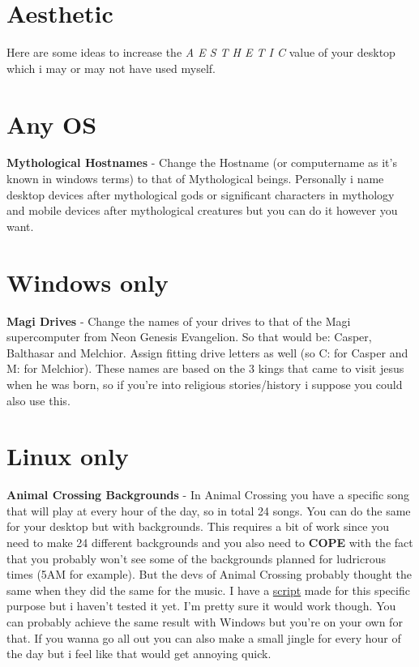 \documentclass{article}
\begin{document}
\section{Aesthetic}
Here are some ideas to increase the \emph{A E S T H E T I C} value of your desktop which i may or may not have used myself.
\section{Any OS}
\textbf{Mythological Hostnames} - Change the Hostname (or computername as it's known in windows terms) to that of Mythological beings. Personally i name desktop devices after mythological gods or significant characters in mythology and mobile devices after mythological creatures but you can do it however you want.
\section{Windows only}
\textbf{Magi Drives} - Change the names of your drives to that of the Magi supercomputer from Neon Genesis Evangelion. So that would be: Casper, Balthasar and Melchior. Assign fitting drive letters as well (so C: for Casper and M: for Melchior). These names are based on the 3 kings that came to visit jesus when he was born, so if you're into religious stories/history i suppose you could also use this.
\section{Linux only}
\textbf{Animal Crossing Backgrounds} - In Animal Crossing you have a specific song that will play at every hour of the day, so in total 24 songs. You can do the same for your desktop but with backgrounds. This requires a bit of work since you need to make 24 different backgrounds and you also need to \textbf{COPE} with the fact that you probably won't see some of the backgrounds planned for ludricrous times (5AM for example). But the devs of Animal Crossing probably thought the same when they did the same for the music. I have a \href{https://github.com/marcello505/configfiles/blob/master/.scripts/clockbackgrounds.sh}{script} made for this specific purpose but i haven't tested it yet. I'm pretty sure it would work though. You can probably achieve the same result with Windows but you're on your own for that. If you wanna go all out you can also make a small jingle for every hour of the day but i feel like that would get annoying quick.
\end{document}
